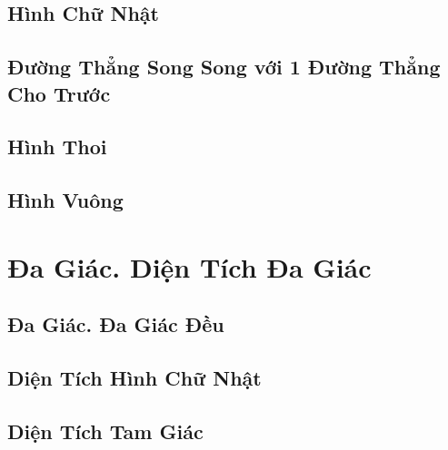 \documentclass{article}
\numberwithin{equation}{section}
\begin{document}
\subsection{Hình Chữ Nhật}


\subsection{Đường Thẳng Song Song với 1 Đường Thẳng Cho Trước}


\subsection{Hình Thoi}


\subsection{Hình Vuông}


\section{Đa Giác. Diện Tích Đa Giác}

\subsection{Đa Giác. Đa Giác Đều}


\subsection{Diện Tích Hình Chữ Nhật}


\subsection{Diện Tích Tam Giác}
\end{document}
